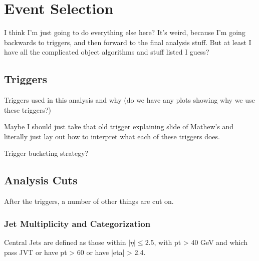 \chapter{Event Selection} \label{chapter:selection}
    
    I think I'm just going to do everything else here? It's weird, because I'm going backwards to triggers,
        and then forward to the final analysis stuff. But at least I have all the complicated object algorithms and stuff listed I guess?




    \section{Triggers}

        

        Triggers used in this analysis and why (do we have any plots showing why we use these triggers?)

        Maybe I should just take that old trigger explaining slide of Mathew's
            and literally just lay out how to interpret what each of these triggers does.

        Trigger bucketing strategy?


    \section{Analysis Cuts} \label{sec:analysis_cuts}

        After the triggers, a number of other things are cut on.

    \subsection{Jet Multiplicity and Categorization}

        Central Jets are defined as those within $|\eta| \leq 2.5$, %
            with pt > 40 GeV and which pass JVT or have pt > 60 or have |eta| > 2.4. %
        
